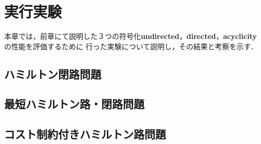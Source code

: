 \chapter{実行実験}
本章では，前章にて説明した３つの符号化\textbf{undirected}，\textbf{directed}，\textbf{acyclicity}の性能を評価するために
行った実験について説明し，その結果と考察を示す．


\section{ハミルトン閉路問題}
\section{最短ハミルトン路・閉路問題}
\section{コスト制約付きハミルトン路問題}

